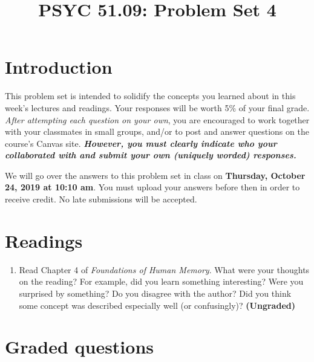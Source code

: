 \documentclass[10pt]{article}
\title{PSYC 51.09: Problem Set 4}
\date{}
\begin{document}
\maketitle
\vspace{-0.75in}
\section*{Introduction}
This problem set is intended to solidify the concepts you learned
about in this week’s lectures and readings.  Your responses will be
worth 5\% of your final grade.  \textit{After attempting each question
  on your own}, you are encouraged to work together with your classmates in small groups, and/or to post and answer questions on the course’s Canvas site.  \textbf{\textit{However, you must clearly indicate who your collaborated with and submit your own (uniquely worded) responses.}}

We will go over the answers to this problem set in class on \textbf{Thursday, October 24, 2019 at 10:10 am}.  You must upload your answers before then in order to receive credit.  No late submissions will be accepted.

\section*{Readings}
\begin{enumerate}
\item Read Chapter 4 of \textit{Foundations of Human Memory}.  What were your thoughts on the reading?  For example, did you learn something interesting?  Were you surprised by something?  Do you disagree with the author?  Did you think some concept was described especially well (or confusingly)?  \textbf{(Ungraded)}
\end{enumerate}

\section*{Graded questions}
\end{document}
